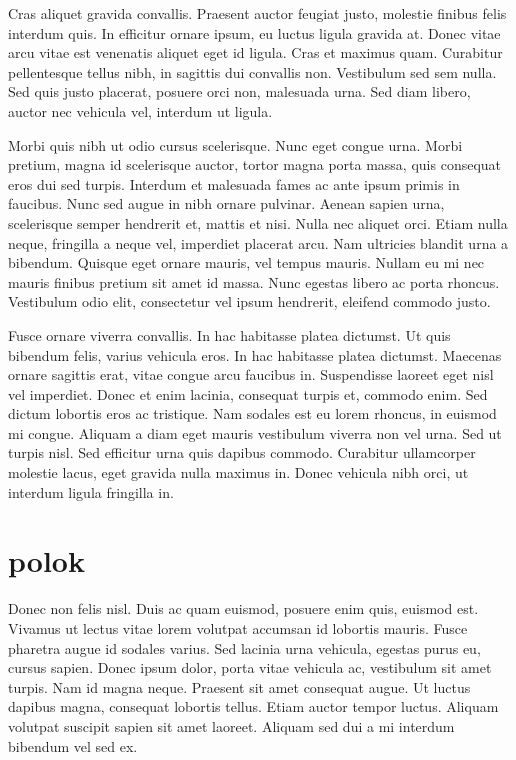 \documentclass[10pt]{llncs}
\begin{document}
Cras aliquet gravida convallis. Praesent auctor feugiat justo, molestie finibus felis interdum quis. In efficitur ornare ipsum, eu luctus ligula gravida at. Donec vitae arcu vitae est venenatis aliquet eget id ligula. Cras et maximus quam. Curabitur pellentesque tellus nibh, in sagittis dui convallis non. Vestibulum sed sem nulla. Sed quis justo placerat, posuere orci non, malesuada urna. Sed diam libero, auctor nec vehicula vel, interdum ut ligula.

Morbi quis nibh ut odio cursus scelerisque. Nunc eget congue urna. Morbi pretium, magna id scelerisque auctor, tortor magna porta massa, quis consequat eros dui sed turpis. Interdum et malesuada fames ac ante ipsum primis in faucibus. Nunc sed augue in nibh ornare pulvinar. Aenean sapien urna, scelerisque semper hendrerit et, mattis et nisi. Nulla nec aliquet orci. Etiam nulla neque, fringilla a neque vel, imperdiet placerat arcu. Nam ultricies blandit urna a bibendum. Quisque eget ornare mauris, vel tempus mauris. Nullam eu mi nec mauris finibus pretium sit amet id massa. Nunc egestas libero ac porta rhoncus. Vestibulum odio elit, consectetur vel ipsum hendrerit, eleifend commodo justo.

Fusce ornare viverra convallis. In hac habitasse platea dictumst. Ut quis bibendum felis, varius vehicula eros. In hac habitasse platea dictumst. Maecenas ornare sagittis erat, vitae congue arcu faucibus in. Suspendisse laoreet eget nisl vel imperdiet. Donec et enim lacinia, consequat turpis et, commodo enim. Sed dictum lobortis eros ac tristique. Nam sodales est eu lorem rhoncus, in euismod mi congue. Aliquam a diam eget mauris vestibulum viverra non vel urna. Sed ut turpis nisl. Sed efficitur urna quis dapibus commodo. Curabitur ullamcorper molestie lacus, eget gravida nulla maximus in. Donec vehicula nibh orci, ut interdum ligula fringilla in.

\section{polok}
Donec non felis nisl. Duis ac quam euismod, posuere enim quis, euismod est. Vivamus ut lectus vitae lorem volutpat accumsan id lobortis mauris. Fusce pharetra augue id sodales varius. Sed lacinia urna vehicula, egestas purus eu, cursus sapien. Donec ipsum dolor, porta vitae vehicula ac, vestibulum sit amet turpis. Nam id magna neque. Praesent sit amet consequat augue. Ut luctus dapibus magna, consequat lobortis tellus. Etiam auctor tempor luctus. Aliquam volutpat suscipit sapien sit amet laoreet. Aliquam sed dui a mi interdum bibendum vel sed ex.
\end{document}

